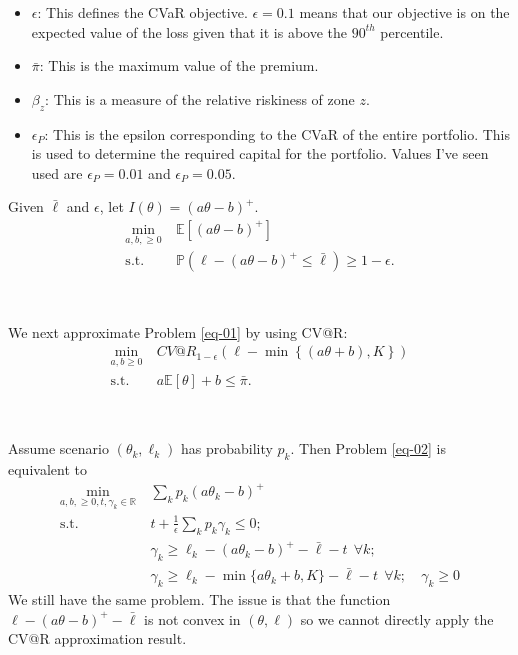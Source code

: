 \documentclass[11pt]{article}
\begin{document}
\begin{itemize}
    \item $\epsilon$: This defines the CVaR objective. $\epsilon = 0.1$ means that our objective is on the expected value of the loss given that it is above the $90^{th}$ percentile. 
    \item $\bar{\pi}$: This is the maximum value of the premium. 
    \item $\beta_z$: This is a measure of the relative riskiness of zone $z$. 
    \item $\epsilon_P$: This is the epsilon corresponding to the CVaR of the entire portfolio. This is used to determine the required capital for the portfolio. Values I've seen used are $\epsilon_P=0.01$ and $\epsilon_P=0.05$. 
\end{itemize}


{\color{red}
Given $\bar{\ell}$ and $\epsilon$, let $I(\theta) = (a\theta - b)^+$.
\begin{align}
    \min_{a,b,\geq 0} &\ \mathbb{E} \left[\left(a\theta - b\right)^+\right]\label{eq-01}\\
    \text{s.t.   } &\ \mathbb{P}\left(\ell  - (a\theta - b)^+ \leq \bar{\ell}\right)\geq 1-\epsilon.
\end{align}


~~~

We next approximate Problem \eqref{eq-01} by using CV@R:
\begin{align}
    \min_{a,b\geq 0} &\ CV@R_{1-\epsilon}\left(\ell  - \min\left\{(a\theta + b), K\right\} \right)\\
    \text{s.t.   } &\   a \mathbb{E} \left[\theta \right] + b\label{eq-02} \leq \bar{\pi}. %
\end{align}

~~~

Assume scenario $(\theta_k, \ell_k)$ has probability $p_k$. Then Problem \eqref{eq-02} is equivalent to 
\begin{align}
    \min_{a,b,\geq 0, t,\gamma_k\in\mathbb{R}} &\ \sum_k p_k \left(a\theta_k - b\right)^+\\
    \text{s.t.   } &\  t + \frac{1}{\epsilon}\sum_k p_k \gamma_k \leq 0;\\
    &\ \gamma_k \geq \ell_k  - (a\theta_k - b)^+ - \bar{\ell} -t\ \  \forall k;\\
    &\ \gamma_k \geq \ell_k  - \min\{a\theta_k +b, K\} - \bar{\ell} -t\ \  \forall k;
    &\ \gamma_k \geq 0
\end{align}
We still have the same problem. The issue is that the function $\ell  - (a\theta - b)^+ - \bar{\ell}$ is not convex in $(\theta, \ell)$ so we cannot directly apply the CV@R approximation result.



}
\end{document}
